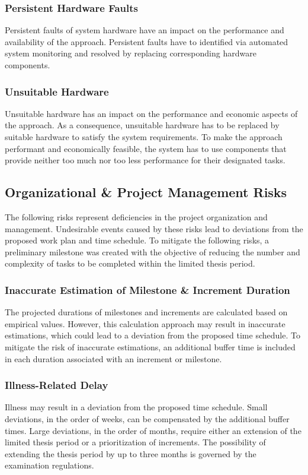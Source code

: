 \subsubsection{Persistent Hardware Faults}
Persistent faults of system hardware have an impact on the performance and availability of the approach.
Persistent faults have to identified via automated system monitoring and resolved by replacing corresponding hardware components.

\subsubsection{Unsuitable Hardware}
Unsuitable hardware has an impact on the performance and economic aspects of the approach.
As a consequence, unsuitable hardware has to be replaced by suitable hardware to satisfy the system requirements.
To make the approach performant and economically feasible, the system has to use components that provide neither too much nor too less performance for their designated tasks.


\subsection{Organizational \& Project Management Risks}
\label{sec:risk_assessment_project_management}
The following risks represent deficiencies in the project organization and management.
Undesirable events caused by these risks lead to deviations from the proposed work plan and time schedule.
To mitigate the following risks, a preliminary milestone was created with the objective of reducing the number and complexity of tasks to be completed within the limited thesis period.

\subsubsection{Inaccurate Estimation of Milestone \& Increment Duration}
The projected durations of milestones and increments are calculated based on empirical values.
However, this calculation approach may result in inaccurate estimations, which could lead to a deviation from the proposed time schedule.
To mitigate the risk of inaccurate estimations, an additional buffer time is included in each duration associated with an increment or milestone.

\subsubsection{Illness-Related Delay}
Illness may result in a deviation from the proposed time schedule.
Small deviations, in the order of weeks, can be compensated by the additional buffer times.
Large deviations, in the order of months, require either an extension of the limited thesis period or a prioritization of increments.
The possibility of extending the thesis period by up to three months is governed by the examination regulations.
